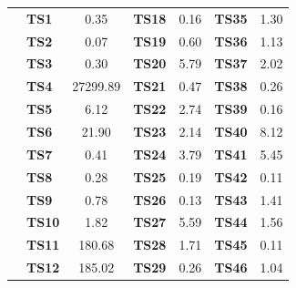 \begin{table}[h]
{\begin{tabular}{|l|l|S[table-format=3.2]|l|S[table-format=3.2]|l|S[table-format=3.2]|}
			& \textbf{TS1}       & 0.35                             & \textbf{TS18}      & 0.16                          & \textbf{TS35}      & 1.30                           \\  
			& \textbf{TS2}       & 0.07                             & \textbf{TS19}      & 0.60                          & \textbf{TS36}      & 1.13                           \\  
			& \textbf{TS3}       & 0.30                             & \textbf{TS20}      & 5.79                          & \textbf{TS37}      & 2.02                           \\  
			& \textbf{TS4}       & 27299.89 & \textbf{TS21}      & 0.47                          & \textbf{TS38}      & 0.26                           \\  
			& \textbf{TS5}       & 6.12                             & \textbf{TS22}      & 2.74                          & \textbf{TS39}      & 0.16                           \\  
			& \textbf{TS6}       & 21.90                            & \textbf{TS23}      & 2.14                          & \textbf{TS40}      & 8.12                           \\  
			& \textbf{TS7}       & 0.41                             & \textbf{TS24}      & 3.79                          & \textbf{TS41}      & 5.45                           \\  
			& \textbf{TS8}       & 0.28                             & \textbf{TS25}      & 0.19                          & \textbf{TS42}      & 0.11                           \\  
			& \textbf{TS9}       & 0.78                             & \textbf{TS26}      & 0.13                          & \textbf{TS43}      & 1.41                           \\  
			& \textbf{TS10}      & 1.82                             & \textbf{TS27}      & 5.59                          & \textbf{TS44}      & 1.56                           \\  
			& \textbf{TS11}      & 180.68   & \textbf{TS28}      & 1.71                          & \textbf{TS45}      & 0.11                           \\  
			& \textbf{TS12}      & 185.02   & \textbf{TS29}      & 0.26                          & \textbf{TS46}      & 1.04                           \\  

\end{tabular}}
\end{table}
